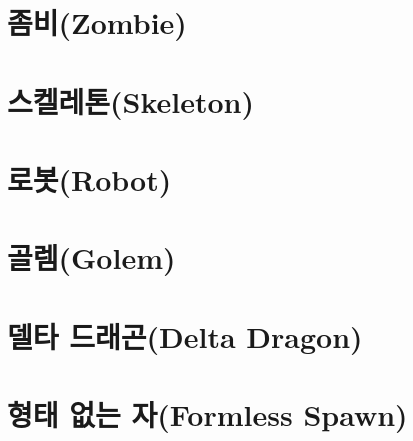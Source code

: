 \documentclass{report}
\begin{document}
	\hypertarget{species:zombie}{}
	\section{좀비(Zombie)}
		
	
	\hypertarget{species:skeleton}{}
	\section{스켈레톤(Skeleton)}
		
		
	\section{로봇(Robot)}
		
	
	\section{골렘(Golem)}
		
	
	\section{델타 드래곤(Delta Dragon)}
		
	
	\hypertarget{species:formless-spawn}{}
	\section{형태 없는 자(Formless Spawn)}
		
	
\end{document}
